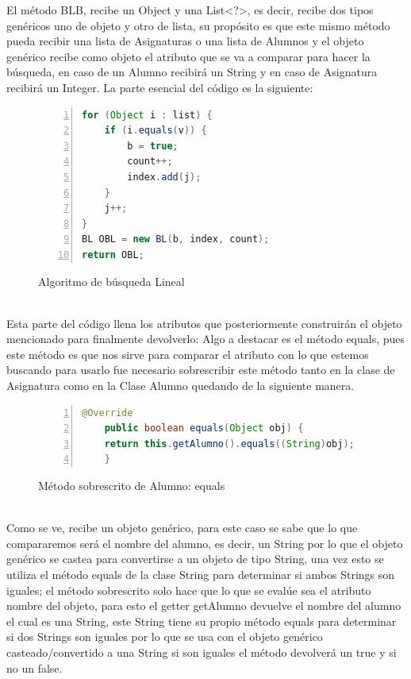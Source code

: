 \documentclass{report}
\begin{document}
El método BLB, recibe un Object y una List<?>, es decir, recibe dos tipos genéricos uno de objeto y otro de lista, su propósito es que este mismo método pueda recibir una lista de Asignaturas o una lista de Alumnos y el objeto genérico recibe como objeto el atributo que se va a comparar para hacer la búsqueda, en caso de un Alumno recibirá un String y en caso de Asignatura recibirá un Integer.
La parte esencial del código es la siguiente:             
\begin{figure}[htbp]
\centering
\begin{lstlisting}[language=Java, frame=lines, framesep=2mm, basicstyle=\footnotesize\ttfamily, numbers=left]
for (Object i : list) {
    if (i.equals(v)) {
        b = true;
        count++;
        index.add(j);
    }
    j++;
}
BL OBL = new BL(b, index, count);
return OBL;
\end{lstlisting}
\caption{Algoritmo de búsqueda Lineal}
\end{figure}
\\Esta parte del código llena los atributos que posteriormente construirán el objeto mencionado para finalmente devolverlo:
Algo a destacar es el método equals, pues este método es que nos sirve para comparar el atributo con lo que estemos buscando para usarlo fue necesario sobrescribir este método tanto en la clase de Asignatura como en la Clase Alumno quedando de la siguiente manera.
\begin{figure}[htbp]
\centering
\begin{lstlisting}[language=Java, frame=lines, framesep=2mm, basicstyle=\footnotesize\ttfamily, numbers=left]
    @Override
    public boolean equals(Object obj) {
    return this.getAlumno().equals((String)obj);
    }
\end{lstlisting}
\caption{Método sobrescrito de Alumno: equals}
\end{figure}
\\Como se ve, recibe un objeto genérico, para este caso se sabe que lo que compararemos será el nombre del alumno, es decir, un String por lo que el objeto genérico se castea para convertirse a un objeto de tipo String, una vez esto se utiliza el método equals de la clase String para determinar si ambos Strings son iguales; el método sobrescrito solo hace que lo que se evalúe sea el atributo nombre del objeto, para esto el getter getAlumno devuelve el nombre del alumno el cual es una String, este String tiene su propio método equals para determinar si dos Strings son iguales por lo que se usa con el objeto genérico casteado/convertido a una String si son iguales el método devolverá un true y si no un false.
\end{document}
